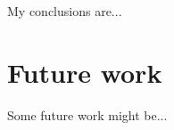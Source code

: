 \label{chapter:conclusion}

My conclusions are...

\section{Future work}
Some future work might be...
